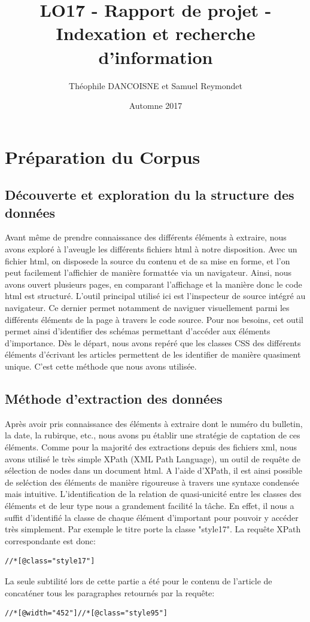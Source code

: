 \documentclass{article}
\title{LO17 - Rapport de projet - Indexation et recherche d'information}
\author{Théophile DANCOISNE et Samuel Reymondet}
\date{Automne 2017}
\begin{document}
\maketitle


\section{Préparation du Corpus}

\subsection{Découverte et exploration du la structure des données}
Avant même de prendre connaissance des différents éléments à extraire, nous avons exploré à l'aveugle les différents fichiers html à notre disposition. Avec un fichier html, on disposede la source du contenu et de sa mise en forme, et l'on peut facilement l'affichier de manière formattée via un navigateur. Ainsi, nous avons ouvert plusieurs pages, en comparant l'affichage et la manière donc le code html est structuré. L'outil principal utilisé ici est l'inspecteur de source intégré au navigateur. Ce dernier permet notamment de naviguer visuellement parmi les différents éléments de la page à travers le code source. Pour nos besoins, cet outil permet ainsi d'identifier des schémas permettant d'accéder aux éléments d'importance. Dès le départ, nous avons repéré que les classes CSS des différents éléments d'écrivant les articles permettent de les identifier de manière quasiment unique. C'est cette méthode que nous avons utilisée.

\subsection{Méthode d'extraction des données}
Après avoir pris connaissance des éléments à extraire dont le numéro du bulletin, la date, la rubirque, etc., nous avons pu établir une stratégie de captation de ces éléments. Comme pour la majorité des extractions depuis des fichiers xml, nous avons utilisé le très simple XPath (XML Path Language), un outil de requête de sélection de nodes dans un document html. A l'aide d'XPath, il est ainsi possible de seléction des éléments de manière rigoureuse à travers une syntaxe condensée mais intuitive.
L'identification de la relation de quasi-unicité entre les classes des éléments et de leur type nous a grandement facilité la tâche. En effet, il nous a suffit d'identifié la classe de chaque élément d'important pour pouvoir y accéder très simplement. Par exemple le titre porte la classe "style17". La requête XPath correspondante est donc:
\begin{lstlisting}
//*[@class="style17"]
\end{lstlisting}
La seule subtilité lors de cette partie a été pour le contenu de l'article de concaténer tous les paragraphes retournés par la requête:
\begin{lstlisting}
//*[@width="452"]//*[@class="style95"]
\end{lstlisting}
\end{document}
